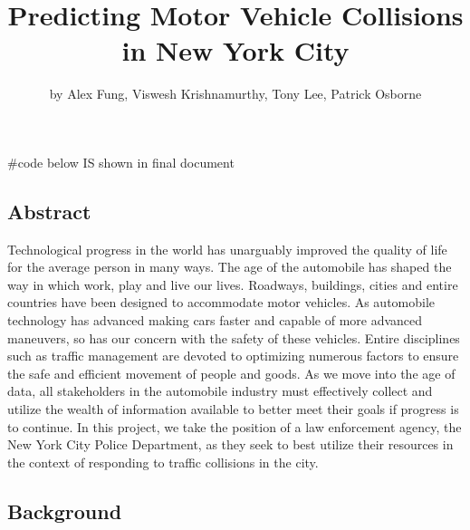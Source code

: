 \title{Predicting Motor Vehicle Collisions in New York City}
\author{by Alex Fung, Viswesh Krishnamurthy, Tony Lee, Patrick Osborne}

\maketitle


\begin{Schunk}
\begin{Sinput}
#code below IS shown in final document
\end{Sinput}
\end{Schunk}

\hypertarget{abstract}{%
\subsection{Abstract}\label{abstract}}

Technological progress in the world has unarguably improved the quality
of life for the average person in many ways. The age of the automobile
has shaped the way in which work, play and live our lives. Roadways,
buildings, cities and entire countries have been designed to accommodate
motor vehicles. As automobile technology has advanced making cars faster
and capable of more advanced maneuvers, so has our concern with the
safety of these vehicles. Entire disciplines such as traffic management
are devoted to optimizing numerous factors to ensure the safe and
efficient movement of people and goods. As we move into the age of data,
all stakeholders in the automobile industry must effectively collect and
utilize the wealth of information available to better meet their goals
if progress is to continue. In this project, we take the position of a
law enforcement agency, the New York City Police Department, as they
seek to best utilize their resources in the context of responding to
traffic collisions in the city.

\hypertarget{background}{%
\subsection{Background}\label{background}}

